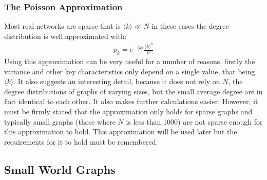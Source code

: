 \documentclass{article}
\begin{document}
            \subsubsection{The Poisson Approximation}
            Most real networks are sparse that is $\langle k \rangle \ll N$ in these cases the degree distribution is well approximated with:
            \begin{align*}
                p_{k} = e^{-\langle k \rangle}\frac{{\langle k \rangle}^k}{k!}
            \end{align*}
            Using this approximation can be very useful for a number of reasons, firstly the variance and other key characteristics only depend on a single value, that being $\langle k \rangle$. It also suggests an interesting detail, because it does not rely on $N$, the degree distributions of graphs of varying sizes, but the small average degree are in fact identical to each other. It also makes further calculations easier. However, it must be firmly stated that the approximation only holds for sparse graphs and typically small graphs (those where $N$ is less than 1000) are not sparse enough for this approximation to hold. This approximation will be used later but the requirements for it to hold must be remembered.
        \subsection{Small World Graphs}
\end{document}
